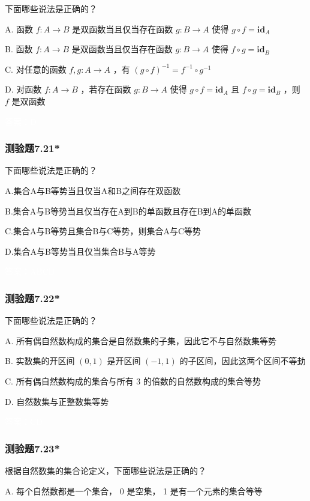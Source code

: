 \documentclass[UTF8, heading=true]{ctexart}
\begin{document}
下面哪些说法是正确的？

A. 函数 $f: A \rightarrow B$ 是双函数当且仅当存在函数 $g: B \rightarrow A$ 使得 $g \circ f=\mathbf{i d}_A$

B. 函数 $f: A \rightarrow B$ 是双函数当且仅当存在函数 $g: B \rightarrow A$ 使得 $f \circ g=\mathbf{i d}_B$

C. 对任意的函数 $f, g: A \rightarrow A$ ，有 $(g \circ f)^{-1}=f^{-1} \circ g^{-1}$

D.  对函数 $f: A \rightarrow B$ ，若存在函数 $g: B \rightarrow A$ 使得 $g \circ f=\mathbf{i d}_A$ 且 $f \circ g=\mathbf{i d}_B$ ，则 $f$ 是双函数


\textcolor{white}{答案：D}

\subsubsection{测验题7.21*}

下面哪些说法是正确的？

A.集合A与B等势当且仅当A和B之间存在双函数

B.集合A与B等势当且仅当存在A到B的单函数且存在B到A的单函数

C.集合A与B等势且集合B与C等势，则集合A与C等势

D.集合A与B等势当且仅当集合B与A等势

\textcolor{white}{答案：ABCD}

\subsubsection{测验题7.22*}

下面哪些说法是正确的？

A. 所有偶自然数构成的集合是自然数集的子集，因此它不与自然数集等势

B. 实数集的开区间 $(0,1)$ 是开区间 $(-1,1)$ 的子区间，因此这两个区间不等劸

C. 所有偶自然数构成的集合与所有 3 的倍数的自然数构成的集合等势

D. 自然数集与正整数集等势

\textcolor{white}{答案：CD}

\subsubsection{测验题7.23*}

根据自然数集的集合论定义，下面哪些说法是正确的？

A. 
每个自然数都是一个集合， 0 是空集， 1 是有一个元素的集合等等
\end{document}
